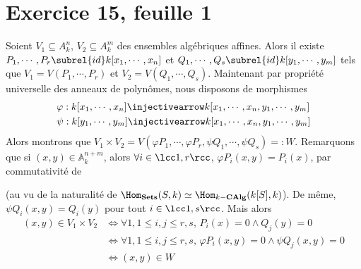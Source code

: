 \documentclass[11pt]{article}
\begin{document}
\section*{Exercice 15, feuille 1}
    Soient $V_1 \subseteq A_k^n$, $V_2 \subseteq A_k^m$ des ensembles algébriques affines. Alors il existe $P_1, \cdots, P_r \subrel{id} k[x_1, \cdots, x_n]$ et $Q_1, \cdots, Q_s \subrel{id} k[y_1, \cdots, y_m]$ tels que $V_1 = V(P_1, \cdots, P_r)$ et $V_2 = V(Q_1, \cdots, Q_s)$. Maintenant par propriété universelle des anneaux de polynômes, nous disposons de morphismes
    \begin{align*}
        &\varphi : k[x_1, \cdots, x_n] \injectivearrow k[x_1, \cdots, x_n, y_1, \cdots, y_m] \\
        &\psi : k[y_1, \cdots, y_m] \injectivearrow k[x_1, \cdots, x_n, y_1, \cdots, y_m] \\
    \end{align*}
    Alors montrons que $V_1 \times V_2 = V(\varphi P_1, \cdots, \varphi P_r, \psi Q_1, \cdots, \psi Q_s) =: W$. Remarquons que si $(x,y) \in \mathbb{A}^{n+m}_k$, alors $\forall i \in \lcc 1,r \rcc$, $\varphi P_i(x,y) = P_i(x)$, par commutativité de
    \begin{figure}[H]
        \centering
    \end{figure} \noindent
    (au vu de la naturalité de $\Hom_{\mathbf{Sets}}(S,k) \simeq \Hom_{k-\mathbf{CAlg}}(k[S],k)$). De même, $\psi Q_i(x,y) = Q_i(y)$ pour tout $i \in \lcc 1,s \rcc$. Mais alors
    \begin{align*}
        (x,y) \in V_1 \times V_2 &\iff \forall 1,1 \leq i,j \leq r,s,\, P_i(x) = 0 \land Q_j(y) = 0 \\
        &\iff \forall 1,1 \leq i,j \leq r,s,\, \varphi P_i(x,y) = 0 \land \psi Q_j(x,y) = 0 \\
        &\iff (x,y) \in W
    \end{align*}
\end{document}
